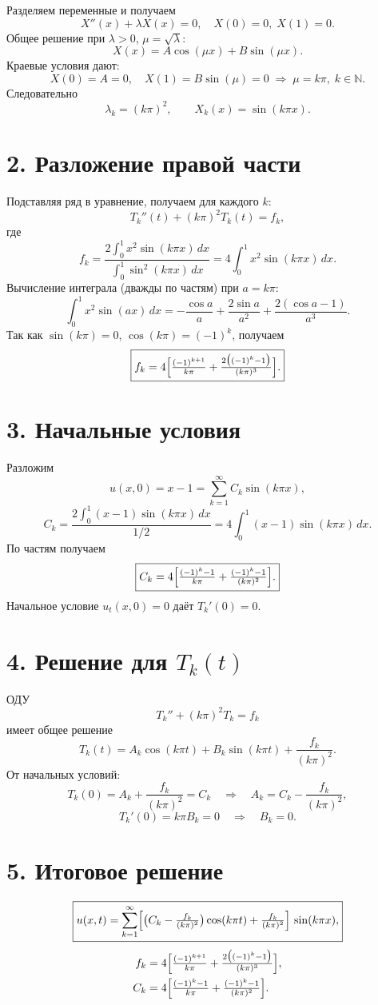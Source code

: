 \documentclass[a4paper,12pt]{article}
\begin{document}
Разделяем переменные и получаем
\[
X''(x)+\lambda X(x)=0,\quad X(0)=0,\;X(1)=0.
\]
Общее решение при $\lambda>0$, $\mu=\sqrt\lambda$:
\[
X(x)=A\cos(\mu x)+B\sin(\mu x).
\]
Краевые условия дают:
\[
X(0)=A=0,\quad X(1)=B\sin(\mu)=0\;\Rightarrow\;\mu=k\pi,\;k\in\mathbb{N}.
\]
Следовательно
\[
\lambda_k=(k\pi)^2,\qquad X_k(x)=\sin(k\pi x).
\]

\section*{2. Разложение правой части}

Подставляя ряд в уравнение, получаем для каждого $k$:
\[
T_k''(t)+(k\pi)^2T_k(t)=f_k,
\]
где
\[
f_k
=\frac{2\int_0^1 x^2\sin(k\pi x)\,dx}{\int_0^1\sin^2(k\pi x)\,dx}
=4\int_0^1 x^2\sin(k\pi x)\,dx.
\]
Вычисление интеграла (дважды по частям) при $a=k\pi$:
\[
\int_0^1 x^2\sin(ax)\,dx
=-\frac{\cos a}{a}
+\frac{2\sin a}{a^2}
+\frac{2(\cos a-1)}{a^3}.
\]
Так как $\sin(k\pi)=0$, $\cos(k\pi)=(-1)^k$, получаем
\[
\boxed{
f_k
=4\Bigl[\tfrac{(-1)^{k+1}}{k\pi}
+\tfrac{2\bigl((-1)^k-1\bigr)}{(k\pi)^3}\Bigr].
}
\]

\section*{3. Начальные условия}

Разложим
\[
u(x,0)=x-1=\sum_{k=1}^\infty C_k\sin(k\pi x),
\]
\[
C_k
=\frac{2\int_0^1 (x-1)\sin(k\pi x)\,dx}{1/2}
=4\int_0^1 (x-1)\sin(k\pi x)\,dx.
\]
По частям получаем
\[
\boxed{
C_k
=4\Bigl[\tfrac{(-1)^k-1}{k\pi}
+\tfrac{(-1)^k-1}{(k\pi)^2}\Bigr].
}
\]
Начальное условие $u_t(x,0)=0$ даёт $T_k'(0)=0$.

\section*{4. Решение для $T_k(t)$}

ОДУ
\[
T_k''+(k\pi)^2T_k=f_k
\]
имеет общее решение
\[
T_k(t)=A_k\cos(k\pi t)+B_k\sin(k\pi t)+\frac{f_k}{(k\pi)^2}.
\]
От начальных условий:
\[
T_k(0)=A_k+\frac{f_k}{(k\pi)^2}=C_k
\quad\Rightarrow\quad
A_k=C_k-\frac{f_k}{(k\pi)^2},
\]
\[
T_k'(0)=k\pi B_k=0\quad\Rightarrow\quad B_k=0.
\]

\section*{5. Итоговое решение}

\[
\boxed{
u(x,t)
=\sum_{k=1}^\infty
\Bigl[\bigl(C_k-\tfrac{f_k}{(k\pi)^2}\bigr)\cos(k\pi t)
      +\tfrac{f_k}{(k\pi)^2}\Bigr]\,
\sin(k\pi x),
}
\]
\[
\begin{aligned}
f_k&=4\Bigl[\tfrac{(-1)^{k+1}}{k\pi}
         +\tfrac{2\bigl((-1)^k-1\bigr)}{(k\pi)^3}\Bigr],\\
C_k&=4\Bigl[\tfrac{(-1)^k-1}{k\pi}
         +\tfrac{(-1)^k-1}{(k\pi)^2}\Bigr].
\end{aligned}
\]
\end{document}
